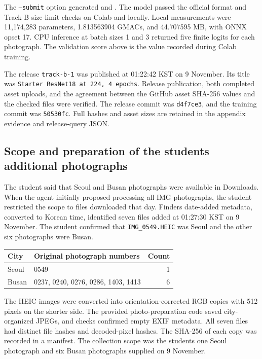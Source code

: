 \documentclass[11pt]{article}
\begin{document}
The \texttt{--submit} option generated  and
. The model passed the official format and
Track B size-limit checks on Colab and locally. Local measurements were
11,174,283 parameters, 1.813563904 GMACs, and 44.707595 MB, with ONNX opset 17.
CPU inference at batch sizes 1 and 3 returned five finite logits for each
photograph. The validation score above is the value recorded during Colab
training.

The release \texttt{track-b-1} was published at 01:22:42 KST on 9 November.
Its title was \texttt{Starter ResNet18 at 224, 4 epochs}. Release publication,
both completed asset uploads, and the agreement between the GitHub asset
SHA-256 values and the checked files were verified. The release commit was
\texttt{d4f7ce3}, and the training commit was \texttt{50530fc}. Full hashes and
asset sizes are retained in the appendix evidence and release-query JSON.

\subsection{Scope and preparation of the student\textquotesingle{}s additional photographs}

The student said that Seoul and Busan photographs were available in Downloads.
When the agent initially proposed processing all IMG photographs, the student
restricted the scope to files downloaded that day. Finder\textquotesingle{}s date-added
metadata, converted to Korean time, identified seven files added at
01:27:30 KST on 9 November. The student confirmed that
\texttt{IMG\_0549.HEIC} was Seoul and the other six photographs were Busan.

\begin{center}\small
\begin{tabular}{llr}
\toprule
City & Original photograph numbers & Count \\
\midrule
Seoul & 0549 & 1 \\
Busan & 0237, 0240, 0276, 0286, 1403, 1413 & 6 \\
\bottomrule
\end{tabular}
\end{center}

The HEIC images were converted into orientation-corrected RGB copies with
512 pixels on the shorter side. The provided photo-preparation code saved
city-organized JPEGs, and checks confirmed empty EXIF metadata. All seven
files had distinct file hashes and decoded-pixel hashes. The SHA-256 of each
copy was recorded in a manifest. The collection scope was the student\textquotesingle{}s one
Seoul photograph and six Busan photographs supplied on 9 November.
\end{document}
